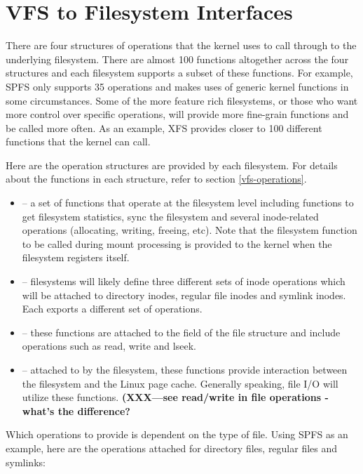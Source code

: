 
\section{VFS to Filesystem Interfaces}

There are four structures of operations that the kernel uses to call through to the underlying filesystem. There are almost 100 functions altogether across the four structures and each filesystem supports a subset of these functions. For example, SPFS only supports 35 operations and makes uses of generic kernel functions in some circumstances. Some of the more feature rich filesystems, or those who want more control over specific operations, will provide more fine-grain functions and be called more often. As an example, XFS provides closer to 100 different functions that the kernel can call.

Here are the operation structures are provided by each filesystem. For details about the functions in each structure, refer to section \ref{vfs-operations}. 

\begin{itemize}
	\item {} -- a set of functions that operate at the filesystem level including functions to get 
		filesystem statistics, sync the filesystem and several inode-related operations (allocating, writing, freeing, etc).
		Note that the filesystem function to be called during mount processing is provided to the kernel when the 
		filesystem registers itself.
	\item {} -- filesystems will likely define three different sets of inode operations which
		will be attached to directory inodes, regular file inodes and symlink inodes. Each exports a different set of operations.
	\item {} -- these functions are attached to the  field of the file structure and include
		operations such as read, write and lseek.
	\item {} -- attached to  by the filesystem, these 
		functions provide interaction between the filesystem and the Linux page cache. Generally speaking, file
		I/O will utilize these functions. \textbf{(XXX---see read/write in file operations - what's the difference?}
\end{itemize}

\noindent
Which operations to provide is dependent on the type of file. Using SPFS as an example, here are the operations attached for directory files, regular files and symlinks:

